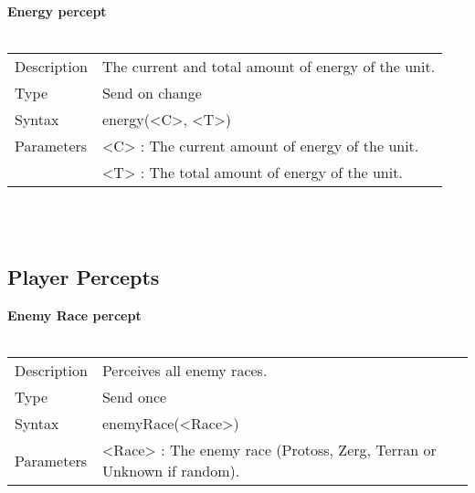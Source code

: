 \documentclass[english,11pt]{report}
\begin{document}
\\
\textbf{Energy percept}\\
\\
\begin{tabularx}{\textwidth}{lX}
 Description & The current and total amount of energy of the unit. \\
 Type & Send on change \\
 Syntax & energy(<C>, <T>) \\
 Parameters & <C> : The current amount of energy of the unit. \\
            & <T> : The total amount of energy of the unit.
\end{tabularx}\\
\\
\subsection{Player Percepts}
\textbf{Enemy Race percept}\\
\\
\begin{tabularx}{\textwidth}{lX}
 Description & Perceives all enemy races. \\
 Type & Send once \\
 Syntax & enemyRace(<Race>) \\
 Parameters &   <Race> : The enemy race (Protoss, Zerg, Terran or Unknown if random).
\end{tabularx}\\
\\
\end{document}

